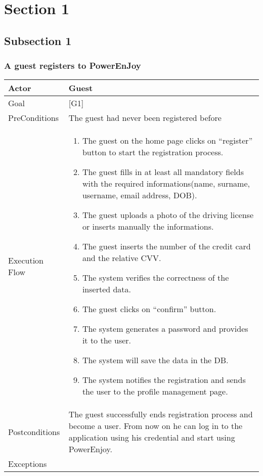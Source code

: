 \documentclass{article}
\begin{document}
	\section{Section 1}
	\subsection{Subsection 1}

	\subsubsection{A guest registers to PowerEnJoy}
	\begin{tabularx}{\textwidth}{  l  X  }
		\hline
		Actor & Guest\\
		\hline
		Goal & [G1]\\
		\hline
		PreConditions & The guest had never been registered before\\
		\hline
		Execution Flow & \begin{enumerate}
                     \item{The guest on the home page clicks on “register” button to start the registration process.}
						 				 \item{The guest fills in at least all mandatory fields with the required informations(name, surname, username, email address, DOB).}
						 			 	 \item{The guest uploads a photo of the driving license or inserts manually the informations.}
										 \item{The guest inserts the number of the credit card and the relative CVV}.
						  		 	 \item{The system verifies the correctness of the inserted data.}
						 			 	 \item{The guest clicks on “confirm” button.}
						 			 	 \item{The system generates a password and provides it to the user.}
						 			 	 \item{The system will save the data in the DB.}
						 			 	 \item{The system notifies the registration and sends the user to the profile management page.}
						 \end{enumerate}\\
		\hline
		Postconditions & The guest successfully ends registration process and become a user. From now on he can log in to the application using his credential and start using PowerEnjoy.\\
		\hline
		Exceptions & \begin{enumerate}

\end{enumerate}
\end{tabularx}
\end{document}
